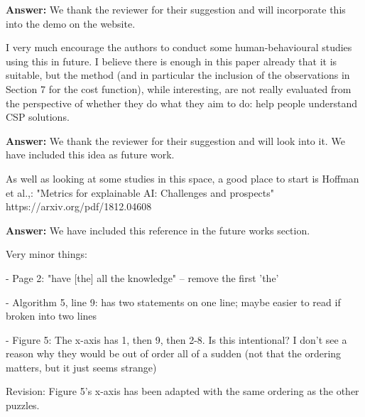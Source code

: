 \documentclass{article}
\newcommand\comment[1]{\marginpar{\tiny #1}}
\renewcommand\comment[1]{#1}
\newcommand{\tias}[1]{{\comment{\color{blue}\textsc{TG:}#1}}}
\newcommand{\emilio}[1]{{\comment{\color{red} \textsc{EG:}#1}}}
\newcommand{\Revision}[1]{{\comment{Revision: #1}}}
\newcommand{\answer}[1]{{\comment{\textbf{Answer:} #1}}}
\newcommand{\bart}[1]{{\comment{\color{green} \textsc{BB:}#1}}}
\begin{document}
\answer{We thank the reviewer for their suggestion and will incorporate this into the demo on the website.} 

\begin{quoteit}
I very much encourage the authors to conduct some human-behavioural studies using this in future. I believe there is enough in this paper already that it is suitable, but the method (and in particular the inclusion of the observations in Section 7 for the cost function), while interesting, are not really evaluated from the perspective of whether they do what they aim to do: help people understand CSP solutions. 
\end{quoteit}

\answer{We thank the reviewer for their suggestion and will look into it. We have included this idea as future work.} 


\begin{quoteit}
As well as looking at some studies in this space, a good place to start is Hoffman et al.,: "Metrics for explainable AI: Challenges and prospects" https://arxiv.org/pdf/1812.04608 
\end{quoteit}

\answer{We have included this reference in the future works section.}
\begin{quoteit}
Very minor things:

- Page 2: "have [the] all the knowledge" -- remove the first 'the'

- Algorithm 5, line 9: has two statements on one line; maybe easier to
read if broken into two lines

- Figure 5: The x-axis has 1, then 9, then 2-8. Is this intentional? I
don't see a reason why they would be out of order all of a sudden (not
that the ordering matters, but it just seems strange)
\end{quoteit}

\Revision{Figure 5's x-axis has been adapted with the same ordering as the other puzzles.}




\end{document}
